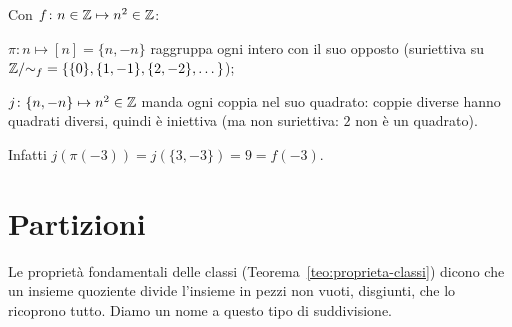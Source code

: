 \begin{spiegazione}
    Con $f \colon n \in \mathbb{Z} \mapsto n^2 \in \mathbb{Z}$:
    \begin{passi}
        \item $\pi \colon n \mapsto [n] = \{n, -n\}$ raggruppa ogni intero con il suo opposto (suriettiva su
              $\mathbb{Z}/{\sim_f} = \{\{0\}, \{1, -1\}, \{2, -2\}, \dots\}$);
        \item $j \colon \{n, -n\} \mapsto n^2 \in \mathbb{Z}$ manda ogni coppia nel suo quadrato: coppie diverse hanno quadrati diversi,
              quindi è iniettiva (ma non suriettiva: $2$ non è un quadrato).
    \end{passi}
    Infatti $j(\pi(-3)) = j(\{3, -3\}) = 9 = f(-3)$.
\end{spiegazione}

\section{Partizioni}\label{sec:partizioni}

Le proprietà fondamentali delle classi (Teorema~\ref{teo:proprieta-classi}) dicono che un insieme quoziente divide l'insieme
in pezzi non vuoti, disgiunti, che lo ricoprono tutto. Diamo un nome a questo tipo di suddivisione.


